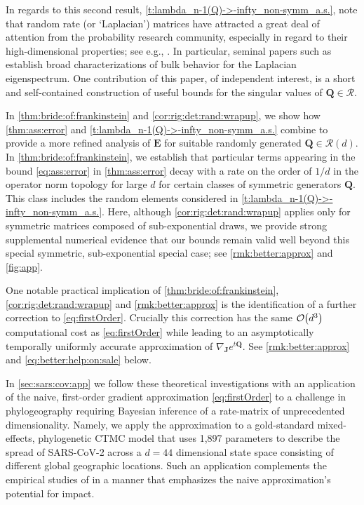 \documentclass[9pt,twocolumn,twoside]{pnas-new}
\newcommand{\order}[1]{{\cal O}\hspace{-0.2em}\left( #1 \right)}
\newcommand{\?}{\textbf{?}}
\newcommand{\E}{{\mathbf{ E}}}
\newcommand{\QQ}{\mathbf{Q}}
\newcommand{\JJ}{\mathbf{J}}
\begin{document}
In regards to this second result,
\cref{t:lambda_n-1(Q)->-infty_non-symm_a.s.}, note that random rate (or
`Laplacian') matrices have attracted a great deal of attention from the
probability research community, especially in regard to their
high-dimensional properties; see e.g., \cite{takahashi:1969,bai:1999,
  chafai:2010, bordenave:caputo:chafai:2012, chatterjee:hazra:2022,
  nakerst:denisov:haque:2023}. In particular, seminal papers such as
\cite{bryc:dembo:jiang:2006, ding:jiang:2010,
  bordenave:caputo:chafai:2014} establish broad characterizations of
bulk behavior for the Laplacian eigenspectrum.  One contribution of
this paper, of independent interest, is a short and self-contained
construction of useful bounds for the singular values of
$\QQ \in \mathcal{R}$.

In \cref{thm:bride:of:frankinstein} and
\cref{cor:rig:det:rand:wrapup}, we show how \cref{thm:ass:error} and
\cref{t:lambda_n-1(Q)->-infty_non-symm_a.s.} combine to provide a more
refined analysis of $\E$ for suitable randomly generated
$\QQ \in \mathcal{R}(d)$. In \cref{thm:bride:of:frankinstein}, we
establish that particular terms appearing in the bound
\eqref{eq:ass:error} in \cref{thm:ass:error} decay with a rate on the
order of $1/d$ in the operator norm topology for large $d$ for certain
classes of symmetric generators $\QQ$. This class includes the random
elements considered in \cref{t:lambda_n-1(Q)->-infty_non-symm_a.s.}.
Here, although \cref{cor:rig:det:rand:wrapup} applies only for
symmetric matrices composed of sub-exponential draws, we provide
strong supplemental numerical evidence that our bounds remain valid
well beyond this special symmetric, sub-exponential special case; see
\cref{rmk:better:approx} and \cref{fig:app}.

One notable practical implication of \cref{thm:bride:of:frankinstein},
\cref{cor:rig:det:rand:wrapup} and \cref{rmk:better:approx} is the
identification of a further correction to
\eqref{eq:firstOrder}. Crucially this correction has the same
$\order{d^3}$ computational cost as \eqref{eq:firstOrder} while
leading to an asymptotically temporally uniformly accurate
approximation of $\nabla_{\JJ} e^{t \QQ}$.  See
\cref{rmk:better:approx} and \eqref{eq:better:help:on:sale} below.

In \cref{sec:sars:cov:app} we follow these theoretical investigations
with an application of the naive, first-order gradient approximation
\eqref{eq:firstOrder} to a challenge in phylogeography requiring
Bayesian inference of a rate-matrix of unprecedented dimensionality.
Namely, we apply the approximation to a gold-standard mixed-effects,
phylogenetic CTMC model that uses 1,897 parameters to describe the
spread of SARS-CoV-2 across a $d=44$ dimensional state space
consisting of different global geographic locations.  Such an
application complements the empirical studies of
\cite{magee2023random} in a manner that emphasizes the naive
approximation's potential for impact.
\end{document}
